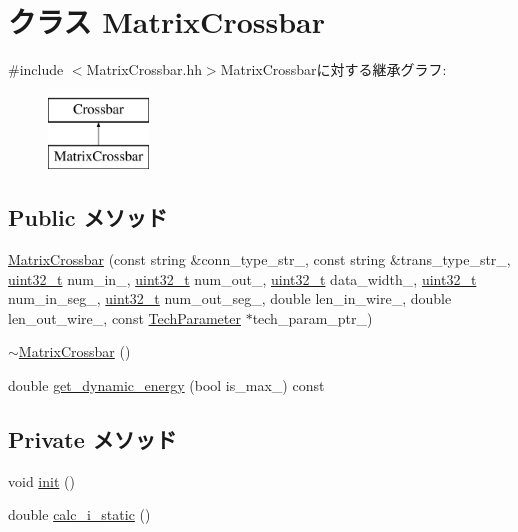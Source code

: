 \hypertarget{classMatrixCrossbar}{
\section{クラス MatrixCrossbar}
\label{classMatrixCrossbar}
}


{\ttfamily \#include $<$MatrixCrossbar.hh$>$}MatrixCrossbarに対する継承グラフ:\begin{figure}[H]
\begin{center}
\leavevmode
\includegraphics[height=2cm]{classMatrixCrossbar}
\end{center}
\end{figure}
\subsection*{Public メソッド}
\begin{DoxyCompactItemize}
\item 
\hyperlink{classMatrixCrossbar_ad6fae5a13780d51dbd7d618caba5660b}{MatrixCrossbar} (const string \&conn\_\-type\_\-str\_\-, const string \&trans\_\-type\_\-str\_\-, \hyperlink{Type_8hh_a435d1572bf3f880d55459d9805097f62}{uint32\_\-t} num\_\-in\_\-, \hyperlink{Type_8hh_a435d1572bf3f880d55459d9805097f62}{uint32\_\-t} num\_\-out\_\-, \hyperlink{Type_8hh_a435d1572bf3f880d55459d9805097f62}{uint32\_\-t} data\_\-width\_\-, \hyperlink{Type_8hh_a435d1572bf3f880d55459d9805097f62}{uint32\_\-t} num\_\-in\_\-seg\_\-, \hyperlink{Type_8hh_a435d1572bf3f880d55459d9805097f62}{uint32\_\-t} num\_\-out\_\-seg\_\-, double len\_\-in\_\-wire\_\-, double len\_\-out\_\-wire\_\-, const \hyperlink{classTechParameter}{TechParameter} $\ast$tech\_\-param\_\-ptr\_\-)
\item 
\hyperlink{classMatrixCrossbar_a55d5985b387f1147e082dfe5e55e79ee}{$\sim$MatrixCrossbar} ()
\item 
double \hyperlink{classMatrixCrossbar_a912bfef03e3ce71b4bbc0b5136b087f5}{get\_\-dynamic\_\-energy} (bool is\_\-max\_\-) const 
\end{DoxyCompactItemize}
\subsection*{Private メソッド}
\begin{DoxyCompactItemize}
\item 
void \hyperlink{classMatrixCrossbar_a02fd73d861ef2e4aabb38c0c9ff82947}{init} ()
\item 
double \hyperlink{classMatrixCrossbar_a0027807356ac4ca07fe2e593234eb884}{calc\_\-i\_\-static} ()
\end{DoxyCompactItemize}
